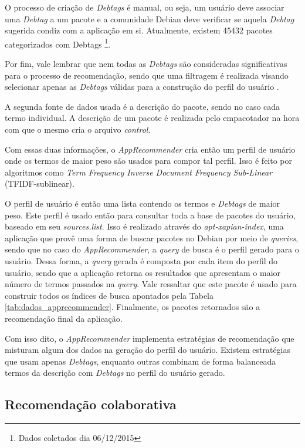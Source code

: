 O processo de criação de \textit{Debtags} é manual, ou seja, um usuário deve associar uma
\textit{Debtag} a um pacote e a comunidade Debian deve verificar se aquela
\textit{Debtag} sugerida condiz com a aplicação em si. Atualmente, existem 45432 pacotes
categorizados com Debtags \footnote{Dados
coletados dia 06/12/2015}.

Por fim, vale lembrar que nem todas as \textit{Debtags} são consideradas significativas
para o processo de recomendação, sendo que uma filtragem é realizada visando
selecionar apenas as \textit{Debtags} válidas para a construção do perfil do usuário
\cite{araujo2011apprecommender}.

A segunda fonte de dados usada é a descrição do pacote, sendo no caso cada termo
individual. A descrição de um pacote é realizada pelo empacotador na hora com
que o mesmo cria o arquivo \textit{control}.

Com essas duas informações, o \textit{AppRecommender} cria então um perfil de usuário
onde os termos de maior peso são usados para compor tal perfil. Isso é feito por
algoritmos como \textit{Term Frequency Inverse Document Frequency Sub-Linear}
(TFIDF-sublinear).

O perfil de usuário é então uma lista contendo os termos e \textit{Debtags} de maior
peso. Este perfil é usado então para consultar toda a base de pacotes
do usuário, baseado em seu \textit{sources.list}.
Isso é realizado através do \textit{apt-xapian-index}, uma aplicação
que provê uma forma de buscar pacotes no Debian por meio de \textit{queries}, sendo que no
caso do \textit{AppRecommender}, a \textit{query} de busca é o perfil gerado para o usuário. Dessa
forma, a \textit{query} gerada é composta por cada item do perfil do usuário, sendo que a
aplicação retorna os resultados que apresentam o maior número de termos passados
na \textit{query}.
Vale ressaltar que este pacote é usado para construir todos os índices de busca
apontados pela Tabela \ref{tab:dados_apprecommender}.
Finalmente, os pacotes retornados são a recomendação final da aplicação.

Com isso dito, o \textit{AppRecommender} implementa estratégias de recomendação que
misturam algum dos dados na geração do perfil do usuário. Existem estratégias
que usam apenas \textit{Debtags}, enquanto outras combinam de forma balanceada termos da
descrição com \textit{Debtags} no perfil do usuário gerado.


\subsection{Recomendação colaborativa}

